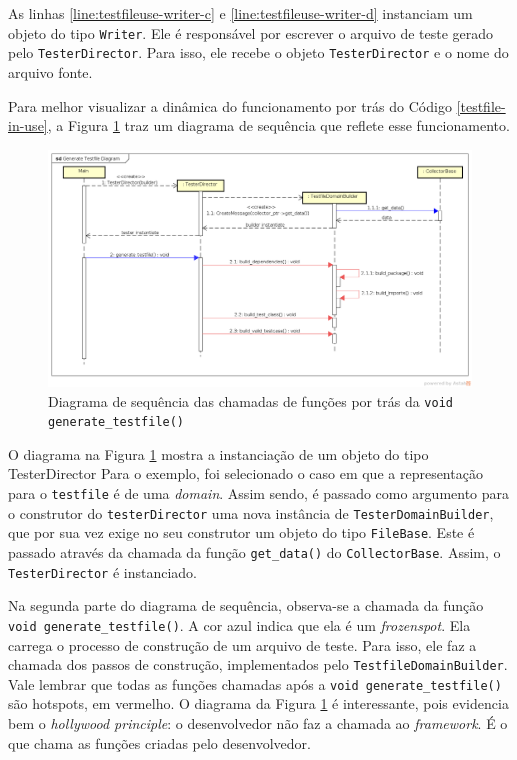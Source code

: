 As linhas \ref{line:testfileuse-writer-c} e \ref{line:testfileuse-writer-d}
instanciam um objeto do tipo \lstinline|Writer|. Ele é responsável por escrever
o arquivo de teste gerado pelo \lstinline|TesterDirector|. Para isso, ele
recebe o objeto \lstinline|TesterDirector| e o nome do arquivo fonte.

Para melhor visualizar a dinâmica do funcionamento por trás do Código
\ref{testfile-in-use}, a Figura \ref{generate-testfile-sequence-diagram}
traz um diagrama de sequência que reflete esse funcionamento.

\begin{landscape}
\begin{figure}[h]
  \centering
    \includegraphics[width=1.5\textwidth, height=\textheight]{figuras/generate-testfile-sequence-diagram.png}
    \caption{Diagrama de sequência das chamadas de funções por trás da \lstinline|void generate_testfile()|}
    \label{generate-testfile-sequence-diagram}
\end{figure}
\FloatBarrier
\end{landscape}

O diagrama na Figura \ref{generate-testfile-sequence-diagram} mostra a instanciação
de um objeto do tipo \textsf{TesterDirector} Para o exemplo, foi selecionado
o caso em que a representação para o \lstinline|testfile| é de uma
\textit{domain}. Assim sendo, é passado como argumento para o construtor do
\lstinline|testerDirector| uma nova instância de \lstinline|TesterDomainBuilder|,
que por sua vez exige no seu construtor um objeto do tipo \lstinline|FileBase|.
Este é passado através da chamada da função \lstinline|get_data()| do
\lstinline|CollectorBase|. Assim, o \lstinline|TesterDirector| é instanciado.

Na segunda parte do diagrama de sequência, observa-se a chamada da função
\lstinline|void generate_testfile()|. A cor azul indica que ela é um
\textit{frozenspot}. Ela carrega o processo de construção de um
arquivo de teste. Para isso, ele faz a chamada dos passos de construção,
implementados pelo \lstinline|TestfileDomainBuilder|. Vale lembrar que
todas as funções chamadas após a \lstinline|void generate_testfile()| são
hotspots, em vermelho. O diagrama da Figura \ref{generate-testfile-sequence-diagram}
é interessante, pois evidencia bem o \textit{hollywood principle}: o
desenvolvedor não faz a chamada ao \textit{framework}. É o \framework que chama
as funções criadas pelo desenvolvedor.

